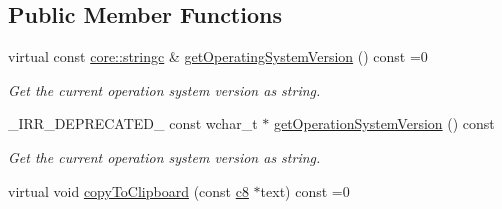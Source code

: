 \subsection*{Public Member Functions}
\begin{DoxyCompactItemize}
\item 
virtual const \hyperlink{namespaceirr_1_1core_ade1071a878633f2f6d8a75c5d11fec19}{core\+::stringc} \& \hyperlink{classirr_1_1IOSOperator_a376386a7fceab8b414eac974a4055839}{get\+Operating\+System\+Version} () const  =0\hypertarget{classirr_1_1IOSOperator_a376386a7fceab8b414eac974a4055839}{}\label{classirr_1_1IOSOperator_a376386a7fceab8b414eac974a4055839}

\begin{DoxyCompactList}\small\item\em Get the current operation system version as string. \end{DoxyCompactList}\item 
\+\_\+\+I\+R\+R\+\_\+\+D\+E\+P\+R\+E\+C\+A\+T\+E\+D\+\_\+ const wchar\+\_\+t $\ast$ \hyperlink{classirr_1_1IOSOperator_a213ace1e7332bf2b08e5c8245784cb0e}{get\+Operation\+System\+Version} () const 
\begin{DoxyCompactList}\small\item\em Get the current operation system version as string. \end{DoxyCompactList}\item 
virtual void \hyperlink{classirr_1_1IOSOperator_a98080d0fa3d8fa1754af10b4d4f60f39}{copy\+To\+Clipboard} (const \hyperlink{namespaceirr_a9395eaea339bcb546b319e9c96bf7410}{c8} $\ast$text) const  =0\hypertarget{classirr_1_1IOSOperator_a98080d0fa3d8fa1754af10b4d4f60f39}{}\label{classirr_1_1IOSOperator_a98080d0fa3d8fa1754af10b4d4f60f39}


\end{DoxyCompactItemize}
